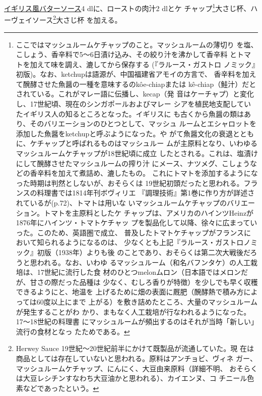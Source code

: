 \begin{recette}
\protect\hyperlink{butter-sauce}{イギリス風バターソース}4
dlに、ローストの肉汁2 dlとケ チャップ\footnote{ここではマッシュルームケチャップのこと。マッシュルームの薄切り
  を塩、こしょう、香辛料で5〜6日漬け込み、その絞り汁を沸かして香辛料
  とトマトを加えて味を調え、漉してから保存する (『ラルース・ガストロ
  ノミック』初版)。なお、ketchupは語源が、中国福建省アモイの方言で、
  香辛料を加えて醗酵させた魚醤の一種を意味するのkôe-chiapまたは
  kê-chiap（鮭汁）だとされている。これがマレー語に伝播し、kecap（発
  音はケーチャプ）と変化し、17世紀頃、現在のシンガポールおよびマレー
  シアを植民地支配していたイギリス人の知るところとなった。イギリスに
  も古くから魚醤の類はあり、そのバリエーションのひとつとして、マッシュ
  ルームとエシャロットを添加した魚醤をketchupと呼ぶようになった。や
  がて魚醤文化の衰退とともに、ケチャップと呼ばれるものはマッシュルー
  ムが主原料となり、いわゆるマッシュルームケチャップが18世紀頃に成立
  したとされる。これは、塩漬けにして醗酵させたマッシュルームの搾り汁
  にメース、ナツメグ、こしょうなどの香辛料を加えて煮詰め、漉したもの。
  これにトマトを添加するようになった時期は判然としないが、おそらくは
  19世紀初頭だったと思われる。フランスの料理書では1814年刊ボヴィリエ
  『調理技術』第1巻に作り方が詳述されているが(p.72)、トマトは用いな
  いマッシュルームケチャップのバリエーション。トマトを主原料としたケ
  チャップは、アメリカのハインツHeinzが1876年にハインツ・トマトケチャッ
  プを製品化して以降、徐々に広まっていった。このため、英語圏で成立、
  普及したトマトケチャップがフランスにおいて知られるようになるのは、
  少なくとも上記『ラルース・ガストロノミック』初版（1938年）よりも後
  のことであり、おそらくは第二次大戦後だろうと思われる。なお、いわゆ
  るマッシュルーム（和名バフンタケ）の人工栽培は、17世紀に流行した食
  材のひとつmelonムロン（日本語ではメロンだが、甘さの際だった品種は
  少なく、むしろ香りが特徴）を少しでも早く収穫できるようにと、地温を
  上げるために畑の表面に厩肥（醗酵熱で積み方によっては60度以上にまで
  上がる）を敷き詰めたところ、大量のマッシュルームが発生することがわ
  かり、まもなく人工栽培が行なわれるようになった。17〜18世紀の料理書
  にマッシュルームが頻出するのはそれが当時「新しい」流行の食材となっ
  たためである。}大さじ\undemi{}杯、ハーヴェイソース\footnote{Herwey
  Sauce 19世紀〜20世紀前半にかけて既製品が流通していた。現
  在は商品としては存在していないと思われる。原料はアンチョビ、ヴィネ
  ガー、マッシュルームケチャップ、にんにく、大豆由来原料（詳細不明、
  おそらくは大豆レシチンすなわち大豆油かと思われる）、カイエンヌ、コ
  チニール色素などであったという。}大さじ\undemi{}杯 を加える。


\end{recette}
